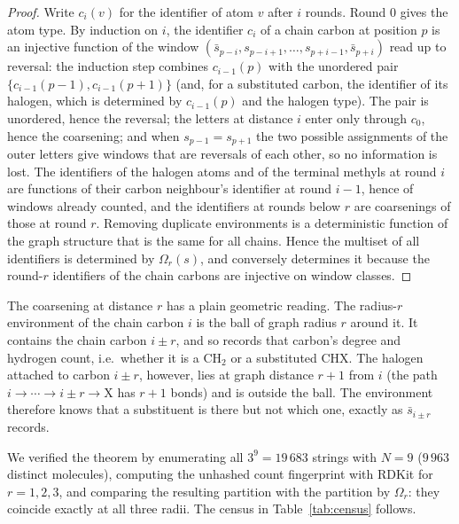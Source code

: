 \documentclass[11pt]{article}
\theoremstyle{plain}
\theoremstyle{definition}
\theoremstyle{remark}
\begin{document}
\begin{proof}
Write $c_i(v)$ for the identifier of atom $v$ after $i$ rounds. Round $0$ gives the atom type. By induction on $i$,
the identifier $c_i$ of a chain carbon at position $p$ is an injective function of the window
$(\bar s_{p-i},s_{p-i+1},\dots,s_{p+i-1},\bar s_{p+i})$ read up to reversal: the induction step combines
$c_{i-1}(p)$ with the unordered pair $\{c_{i-1}(p-1),c_{i-1}(p+1)\}$ (and, for a substituted carbon, the identifier of
its halogen, which is determined by $c_{i-1}(p)$ and the halogen type). The pair is unordered, hence the reversal;
the letters at distance $i$ enter only through $c_0$, hence the coarsening; and when $s_{p-1}=s_{p+1}$ the two
possible assignments of the outer letters give windows that are reversals of each other, so no information is
lost. The identifiers of the halogen atoms and of the terminal methyls at round $i$ are functions of their
carbon neighbour's identifier at round $i-1$, hence of windows already counted, and the identifiers at rounds
below $r$ are coarsenings of those at round $r$. Removing duplicate environments is a deterministic function of
the graph structure that is the same for all chains. Hence the multiset of all identifiers is determined by
$\Omega_r(s)$, and conversely determines it because the round-$r$ identifiers of the chain carbons are injective
on window classes.
\end{proof}

The coarsening at distance $r$ has a plain geometric reading. The radius-$r$ environment of the chain carbon $i$
is the ball of graph radius $r$ around it. It contains the chain carbon $i\pm r$, and so records that carbon's
degree and hydrogen count, i.e.\ whether it is a $\mathrm{CH_2}$ or a substituted $\mathrm{CHX}$. The halogen
attached to carbon $i\pm r$, however, lies at graph distance $r+1$ from $i$ (the path $i\to\cdots\to i\pm r\to
\mathrm X$ has $r+1$ bonds) and is outside the ball. The environment therefore knows that a substituent is
there but not which one, exactly as $\bar s_{i\pm r}$ records.

We verified the theorem by enumerating all $3^9=19\,683$ strings with $N=9$ ($9\,963$ distinct molecules),
computing the unhashed count fingerprint with RDKit \cite{RDKit} for $r=1,2,3$, and comparing the resulting
partition with the partition by $\Omega_r$: they coincide exactly at all three radii. The census in
Table~\ref{tab:census} follows.
\end{document}
